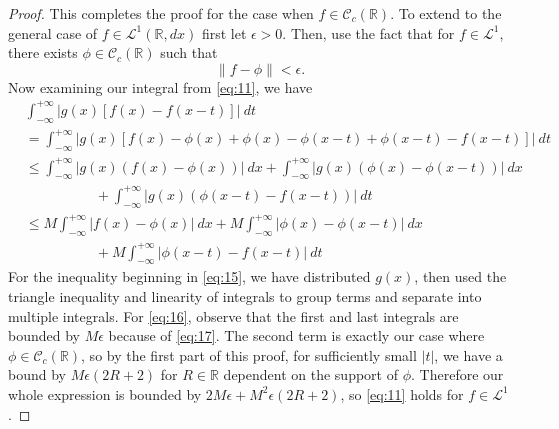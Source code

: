 \documentclass[12pt]{article}
\newcommand{\R}{\mathbb{R}}
\newcommand{\qeq}[1]{\begin{equation}#1\end{equation}}
\newcommand{\qal}[1]{\begin{align}#1\end{align}}
\begin{document}
\begin{proof}
    This completes the proof for the case when $f \in \mathcal{C}_c(\R)$. To extend to the general case of $f \in \mathcal{L}^1(\R, dx)$ first let $\epsilon > 0$. Then, use the fact that for $f \in \mathcal{L}^1$, there exists $\phi \in \mathcal{C}_c (\R)$ such that 
    \qeq{\|f - \phi\| < \epsilon. \label{eq:17}}
    Now examining our integral from \eqref{eq:11}, we have
    \qal{& \int_{-\infty}^{+\infty} |g(x) [f(x) - f(x - t)]| ~dt \nonumber \\
    &= \int_{-\infty}^{+\infty} |g(x) [f(x) - \phi(x) + \phi(x) - \phi(x - t) + \phi(x - t) - f(x - t)]| ~dt \nonumber \\
    &\leq \int_{-\infty}^{+\infty} |g(x) (f(x) - \phi(x))| ~dx + \int_{-\infty}^{+\infty} |g(x)(\phi(x) - \phi(x - t))| ~dx \label{eq:15} \\ & \hspace{5em}+ \int_{-\infty}^{+\infty} |g(x) (\phi(x - t) - f(x - t))| ~dt \nonumber \\
    &\leq M \int_{-\infty}^{+\infty} |f(x) - \phi(x)| ~dx + M \int_{-\infty}^{+\infty} |\phi(x) - \phi(x - t)| ~dx \label{eq:16} \\ & \hspace{5em}+ M \int_{-\infty}^{+\infty} |\phi(x - t) - f(x - t)| ~dt \nonumber}
    For the inequality beginning in \eqref{eq:15}, we have distributed $g(x)$, then used the triangle inequality and linearity of integrals to group terms and separate into multiple integrals. For \eqref{eq:16}, observe that the first and last integrals are bounded by $M \epsilon$ because of \eqref{eq:17}. The second term is exactly our case where $\phi \in \mathcal{C}_c(\R)$, so by the first part of this proof, for sufficiently small $|t|$, we have a bound by $M \epsilon(2R +2)$ for $R \in \R$ dependent on the support of $\phi$. Therefore our whole expression is bounded by $2M \epsilon + M^2 \epsilon(2R + 2)$, so \eqref{eq:11} holds for $f \in \mathcal{L}^1$.
\end{proof}
\end{document}
